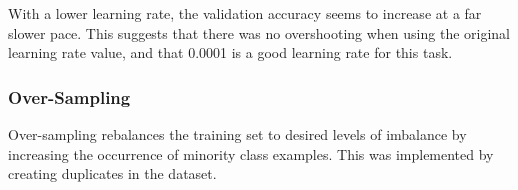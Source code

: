 \documentclass[a4paper,11pt]{article}
\begin{document}
With a lower learning rate, the validation accuracy seems to increase at a far slower pace. This suggests that there was no overshooting when using the original learning rate value, and that 0.0001 is a good learning rate for this task. \\


\subsubsection{Over-Sampling}
Over-sampling \cite{zhou} \cite{maloof} rebalances the training set to desired levels of imbalance by increasing the occurrence of minority class examples. This was implemented by creating duplicates in the dataset. 
\end{document}
